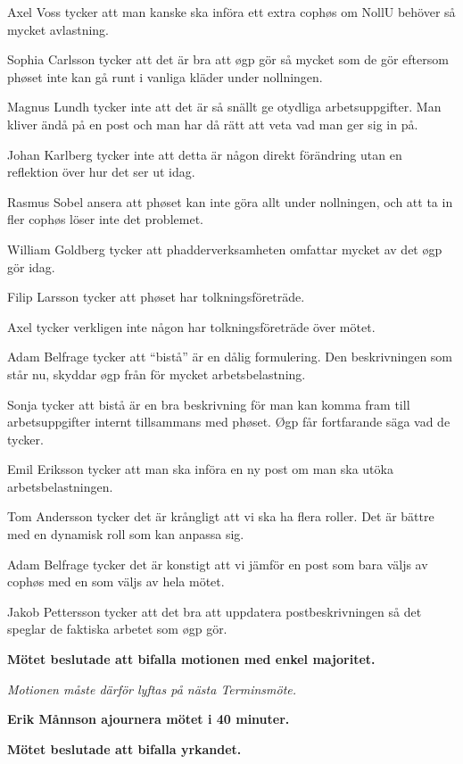 \documentclass[10pt]{article}
\begin{document}
\begin{paragrafer}
\begin{paragrafer}
		Axel Voss tycker att man kanske ska införa ett extra cophøs om NollU behöver så mycket avlastning. 

		Sophia Carlsson tycker att det är bra att øgp gör så mycket som de gör eftersom phøset inte kan gå runt i vanliga kläder under nollningen.

		Magnus Lundh tycker inte att det är så snällt ge otydliga arbetsuppgifter. Man kliver ändå på en post och man har då rätt att veta vad man ger sig in på.

		Johan Karlberg tycker inte att detta är någon direkt förändring utan en reflektion över hur det ser ut idag.

		Rasmus Sobel ansera att phøset kan inte göra allt under nollningen, och att ta in fler cophøs löser inte det problemet. 

		William Goldberg tycker att phadderverksamheten omfattar mycket av det øgp gör idag. 

		Filip Larsson tycker att phøset har tolkningsföreträde.

		Axel tycker verkligen inte någon har tolkningsföreträde över mötet.

		Adam Belfrage tycker att ``bistå'' är en dålig formulering. Den beskrivningen som står nu, skyddar øgp från för mycket arbetsbelastning.

		Sonja tycker att bistå är en bra beskrivning för man kan komma fram till arbetsuppgifter internt tillsammans med phøset. Øgp får fortfarande säga vad de tycker.

		Emil Eriksson tycker att man ska införa en ny post om man ska utöka arbetsbelastningen.

		Tom Andersson tycker det är krångligt att vi ska ha flera roller. Det är bättre med en dynamisk roll som kan anpassa sig. 

		Adam Belfrage tycker det är konstigt att vi jämför en post som bara väljs av cophøs med en som väljs av hela mötet.

		Jakob Pettersson tycker att det bra att uppdatera postbeskrivningen så det speglar de faktiska arbetet som øgp gör. 

		\textbf{Mötet beslutade att bifalla motionen med enkel majoritet.}

		\emph{Motionen måste därför lyftas på nästa Terminsmöte.}

		\newpage

		\textbf{Erik Månnson \ypa ajournera mötet i 40 minuter.}
		
		\textbf{Mötet beslutade att bifalla yrkandet.}


\end{paragrafer}
\end{paragrafer}
\end{document}
